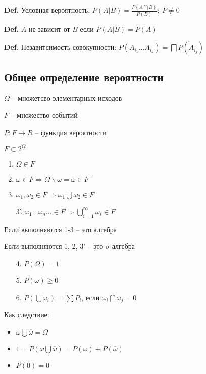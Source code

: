 \documentclass[14pt, letter paper]{article}
\begin{document}
\textbf{Def.} Условная вероятность: $P(A|B) = \frac{P(A \bigcap B)}{P(B)};\ P \neq 0$

\textbf{Def.} $A$ не зависит от $B$ если $P(A|B) = P(A)$

\textbf{Def.} Незавитсимость совокупности: $P(A_{i_1} \ldots A_{i_k}) = \bigsqcap P(A_{i_j})$

\vspace{5mm}

\begin{center}
    \item \subsection*{Общее определение вероятности}
\end{center} 

$\Omega$ -- множетсво элементарных исходов

$F$ -- множество событий

$P : F \rightarrow R$ -- функция вероятности

$F \subset 2^\Omega$

\begin{enumerate}
    \item $\Omega \in F$
    
    \item $\omega \in F \Rightarrow \Omega \backslash \omega = \overline{\omega} \in F$
    
    \item $\omega_1, \omega_2 \in F \Rightarrow \omega_1 \bigcup \omega_2 \in F$

    \item[3'.] $\omega_1 \ldots \omega_n \ldots \in F \Rightarrow \bigcup\limits_{i=1}^\infty \omega_i \in F$
\end{enumerate}

Если выполняются 1-3 -- это алгебра

Если выполняются 1, 2, 3' -- это $\sigma$-алгебра

\begin{enumerate}
    \item[4.] $P(\Omega) = 1$
    \item[5.] $P(\omega) \geq 0$
    \item[6.] $P(\bigcup \omega_i) = \sum P_i$, если $\omega_i \bigcap \omega_j = 0$
\end{enumerate}

Как следствие:

\begin{itemize}
    \item $\omega \bigcup \overline{\omega} = \Omega$
    \item $1 = P(\omega \bigcup \overline{\omega}) = P(\omega) + P(\overline{\omega})$
    \item $P(0) = 0$
\end{itemize}
\end{document}
